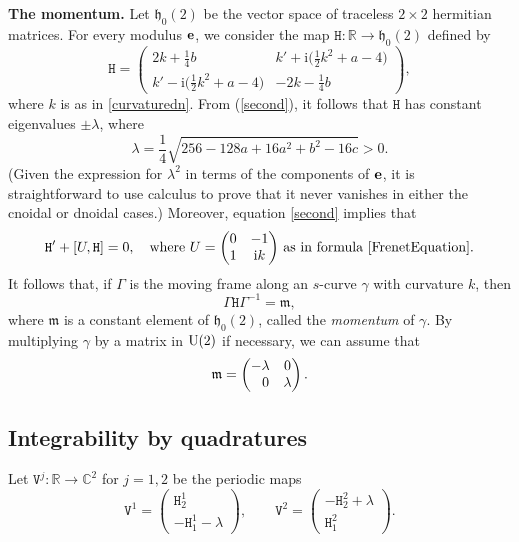 \documentclass[pdftex]{sigma}
\newcommand\kk{k} %
\def\ri{\mathrm{i}}
\def\gam{\gamma} %
\def\C{\mathbb C}
\def\R{\mathbb R}
\newcommand\be{{\bf e}}
\numberwithin{equation}{section}
\begin{document}
{\bf The momentum.}
Let $\mathfrak{h}_0(2)$ be the vector space of traceless $2\times 2$ hermitian matrices. For every modulus $\be$, we consider the map ${\mathtt H}\colon \R\to \mathfrak {h}_0(2)$ defined by
\begin{equation}\label{hamiltonian}
{\mathtt H}=
\begin{pmatrix}
2\kk + \tfrac14 b & \kk' + \ri\bigl(\tfrac12 \kk^2 + a-4\bigr) \\
\kk' - \ri\bigl(\tfrac12 \kk^2 + a-4\bigr) & -2\kk -\tfrac14 b
\end{pmatrix},
\end{equation}
where $\kk$ is as in \eqref{curvaturedn}. From (\ref{second}), it follows that ${\mathtt H}$ has constant eigenvalues $\pm \lambda$, where
\[\lambda=\frac{1}{4}\sqrt{256-128a+16a^2+b^2-16c}>0.\]
\big(Given the expression for $\lambda^2$ in terms of the components of $\be$, it is straightforward to
use calculus to prove that it never vanishes in either the cnoidal or dnoidal cases.\big)
Moreover, equation \eqref{second} implies that
\[
{\mathtt H}'+[U, {\mathtt H}]=0, \quad
\text{where $U = \begin{pmatrix} 0 & -1 \\ 1 & \ri \kk\end{pmatrix}$ as in formula~\eqref{FrenetEquation}.}
\]
It follows that, if $\Gamma$ is the moving frame along an $s$-curve $\gam$ with curvature $\kk$, then
\begin{equation}\label{momentum2}\Gamma  {\mathtt H}  \Gamma^{-1}={\mathfrak m},\end{equation}
where ${\mathfrak m}$ is a constant element of ${\mathfrak h}_0(2)$, called the {\it momentum} of $\gamma$. By multiplying $\gam$ by a matrix in ${\rm U}(2)$ if necessary, we can assume that
\begin{equation}\label{simconf}{\mathfrak m}=\begin{pmatrix} -\lambda &0 \\ \hphantom{-}0 &\lambda\end{pmatrix}.\end{equation}

\subsection{Integrability by quadratures}\label{quadsec}
Let ${\mathtt V}^j\colon \R\to \C^2$ for $j=1,2$ be the periodic maps
\begin{equation}\label{Vdefs}
{\mathtt V}^1 = \begin{pmatrix}{\mathtt H}^1_2 \\ -{\mathtt H}^1_1-\lambda\end{pmatrix},\qquad
{\mathtt V}^2 = \begin{pmatrix}-{\mathtt H}^2_2+\lambda \\ {\mathtt H}^2_1\end{pmatrix}.
\end{equation}
\end{document}
